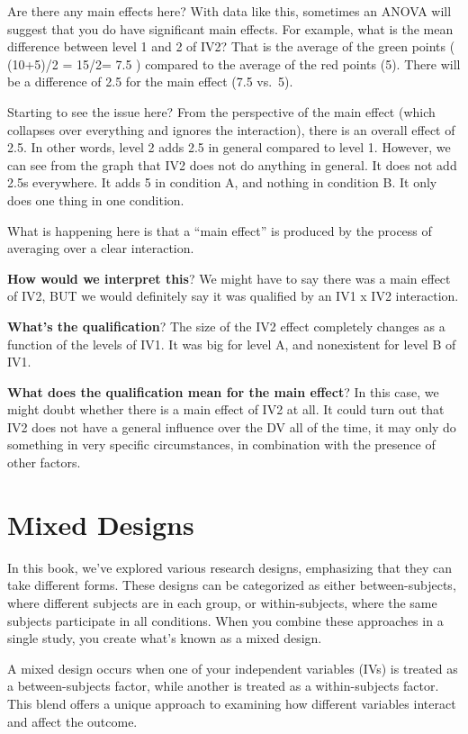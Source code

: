\documentclass[
  letterpaper,
  DIV=11,
  numbers=noendperiod]{scrreprt}
\begin{document}
Are there any main effects here? With data like this, sometimes an ANOVA
will suggest that you do have significant main effects. For example,
what is the mean difference between level 1 and 2 of IV2? That is the
average of the green points ( (10+5)/2 = 15/2= 7.5 ) compared to the
average of the red points (5). There will be a difference of 2.5 for the
main effect (7.5 vs.~5).

Starting to see the issue here? From the perspective of the main effect
(which collapses over everything and ignores the interaction), there is
an overall effect of 2.5. In other words, level 2 adds 2.5 in general
compared to level 1. However, we can see from the graph that IV2 does
not do anything in general. It does not add 2.5s everywhere. It adds 5
in condition A, and nothing in condition B. It only does one thing in
one condition.

What is happening here is that a ``main effect'' is produced by the
process of averaging over a clear interaction.

\textbf{How would we interpret this}? We might have to say there was a
main effect of IV2, BUT we would definitely say it was qualified by an
IV1 x IV2 interaction.

\textbf{What's the qualification}? The size of the IV2 effect completely
changes as a function of the levels of IV1. It was big for level A, and
nonexistent for level B of IV1.

\textbf{What does the qualification mean for the main effect}? In this
case, we might doubt whether there is a main effect of IV2 at all. It
could turn out that IV2 does not have a general influence over the DV
all of the time, it may only do something in very specific
circumstances, in combination with the presence of other factors.

\section{Mixed Designs}\label{mixed-designs}

In this book, we've explored various research designs, emphasizing that
they can take different forms. These designs can be categorized as
either between-subjects, where different subjects are in each group, or
within-subjects, where the same subjects participate in all conditions.
When you combine these approaches in a single study, you create what's
known as a mixed design.

A mixed design occurs when one of your independent variables (IVs) is
treated as a between-subjects factor, while another is treated as a
within-subjects factor. This blend offers a unique approach to examining
how different variables interact and affect the outcome.
\end{document}
